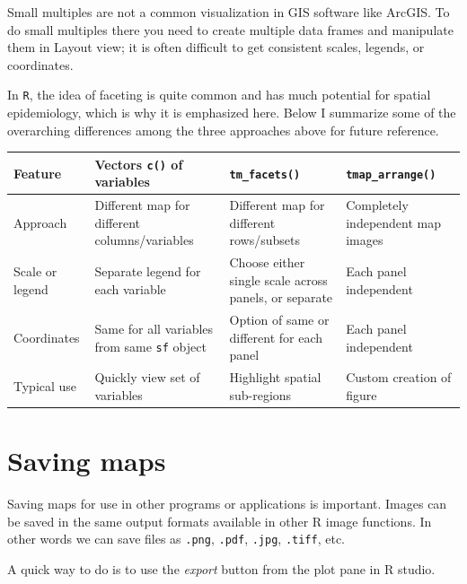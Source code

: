 \documentclass[
]{book}
\begin{document}
Small multiples are not a common visualization in GIS software like ArcGIS. To do small multiples there you need to create multiple data frames and manipulate them in Layout view; it is often difficult to get consistent scales, legends, or coordinates.

In \texttt{R}, the idea of faceting is quite common and has much potential for spatial epidemiology, which is why it is emphasized here. Below I summarize some of the overarching differences among the three approaches above for future reference.

\begin{longtable}[]{@{}
  >{\raggedright\arraybackslash}p{}
  >{\raggedright\arraybackslash}p{}
  >{\raggedright\arraybackslash}p{}
  >{\raggedright\arraybackslash}p{}@{}}
\toprule
Feature & Vectors \texttt{c()} of variables & \texttt{tm\_facets()} & \texttt{tmap\_arrange()} \\
\midrule
\endhead
Approach & Different map for different columns/variables & Different map for different rows/subsets & Completely independent map images \\
Scale or legend & Separate legend for each variable & Choose either single scale across panels, or separate & Each panel independent \\
Coordinates & Same for all variables from same \texttt{sf} object & Option of same or different for each panel & Each panel independent \\
Typical use & Quickly view set of variables & Highlight spatial sub-regions & Custom creation of figure \\
\bottomrule
\end{longtable}

\hypertarget{saving-maps}{%
\section{Saving maps}\label{saving-maps}}

Saving maps for use in other programs or applications is important. Images can be saved in the same output formats available in other R image functions. In other words we can save files as \texttt{.png}, \texttt{.pdf}, \texttt{.jpg}, \texttt{.tiff}, etc.

A quick way to do is to use the \emph{export} button from the plot pane in R studio.
\end{document}
